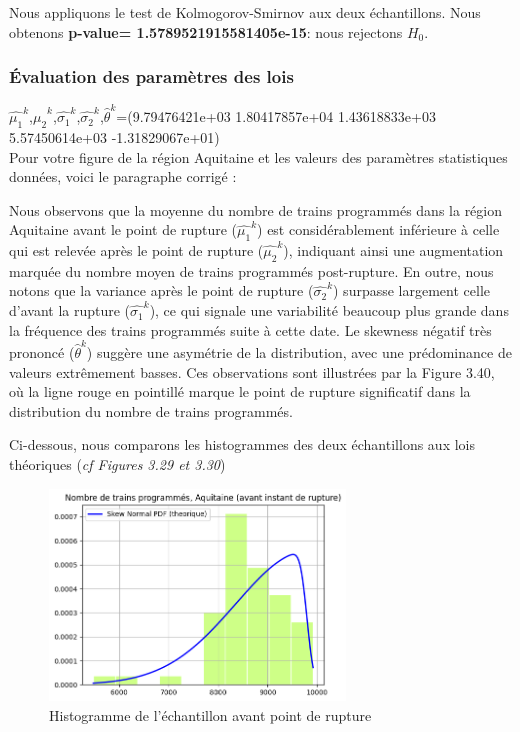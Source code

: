 {Nous appliquons le test de Kolmogorov-Smirnov aux deux échantillons. Nous obtenons \textbf{p-value=  1.5789521915581405e-15}: nous rejectons $H_0$.

\subsubsection{Évaluation des paramètres des lois}

$\hat{\mu_1}^k$,$\hat{\mu_2}^k$,$\hat{\sigma_1}^k$,$\hat{\sigma_2}^k$,$\hat{\theta}^k$=(9.79476421e+03  1.80417857e+04  1.43618833e+03  5.57450614e+03
 -1.31829067e+01)\\
 

Pour votre figure de la région Aquitaine et les valeurs des paramètres statistiques données, voici le paragraphe corrigé :

Nous observons que la moyenne du nombre de trains programmés dans la région Aquitaine avant le point de rupture ($\hat{\mu_1}^k$) est considérablement inférieure à celle qui est relevée après le point de rupture ($\hat{\mu_2}^k$), indiquant ainsi une augmentation marquée du nombre moyen de trains programmés post-rupture. En outre, nous notons que la variance après le point de rupture ($\hat{\sigma_2}^k$) surpasse largement celle d'avant la rupture ($\hat{\sigma_1}^k$), ce qui signale une variabilité beaucoup plus grande dans la fréquence des trains programmés suite à cette date. Le skewness négatif très prononcé ($\hat{\theta}^k$) suggère une asymétrie de la distribution, avec une prédominance de valeurs extrêmement basses. Ces observations sont illustrées par la Figure 3.40, où la ligne rouge en pointillé marque le point de rupture significatif dans la distribution du nombre de trains programmés.

Ci-dessous, nous comparons les histogrammes des deux échantillons aux lois théoriques (\textit{cf Figures 3.29 et 3.30})

\begin{figure}[H]
  \centering
  \includegraphics[width=0.7\textwidth]{image/AQ-FIG5.png}
  \caption{Histogramme de l'échantillon avant point de rupture}
\end{figure}

}
